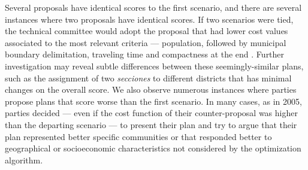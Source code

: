 \documentclass[letter,12pt]{article}
\begin{document}
Several proposals have identical scores to the first scenario, and there are several instances where two proposals have identical scores. If two scenarios were tied, the technical committee would adopt the proposal that had lower cost values associated to the most relevant criteria --- population, followed by municipal boundary delimitation, traveling time and compactness at the end \citep{acuerdoife2013}. Further investigation may reveal subtle differences between these seemingly-similar plans, such as the assignment of two \emph{secciones} to different districts that has minimal changes on the overall score. We also observe numerous instances where parties propose plans that score worse than the first scenario. In many cases, as in 2005, parties decided --- even if the cost function of their counter-proposal was higher than the departing scenario --- to present their plan and try to argue that their plan represented better specific communities or that responded better to geographical or socioeconomic characteristics not considered by the optimization algorithm.






\end{document}
